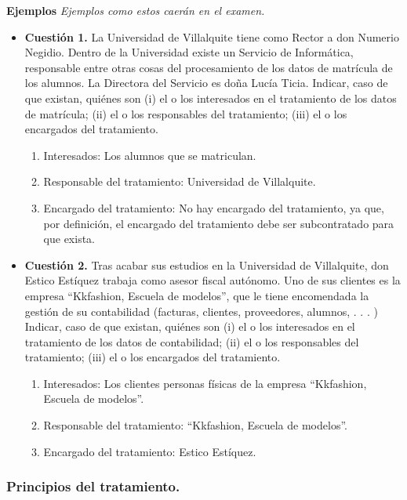 \documentclass[spanish, 12pt, a4paper, twoside]{article}
\begin{document}
\textbf{Ejemplos}
\textit{Ejemplos como estos caerán en el examen.}
\begin{itemize}
    \item \textbf{Cuestión 1.} La Universidad de Villalquite tiene como Rector a don Numerio Negidio. Dentro de la Universidad existe un Servicio de Informática, responsable entre otras cosas del procesamiento de los datos de matrícula de los alumnos. La Directora del Servicio es doña Lucía Ticia.
    Indicar, caso de que existan, quiénes son (i) el o los interesados en el tratamiento de los datos de matrícula; (ii) el o los responsables del tratamiento; (iii) el o los encargados del tratamiento.
    \begin{enumerate}
        \item Interesados: Los alumnos que se matriculan.
        \item Responsable del tratamiento: Universidad de Villalquite.
        \item Encargado del tratamiento: No hay encargado del tratamiento, ya que, por definición, el encargado del tratamiento debe ser subcontratado para que exista.
    \end{enumerate}

    \item \textbf{Cuestión 2.} Tras acabar sus estudios en la Universidad de Villalquite, don Estico Estíquez trabaja como asesor fiscal autónomo. Uno de sus clientes es la empresa “Kkfashion, Escuela de modelos”, que le tiene encomendada la gestión de su contabilidad (facturas, clientes, proveedores, alumnos, . . . )
    Indicar, caso de que existan, quiénes son (i) el o los interesados en el tratamiento de los datos de contabilidad; (ii) el o los responsables del tratamiento; (iii) el o los encargados del tratamiento.
    \begin{enumerate}
        \item Interesados: Los clientes personas físicas de la empresa “Kkfashion, Escuela de modelos”.
        \item Responsable del tratamiento: “Kkfashion, Escuela de modelos”.
        \item Encargado del tratamiento: Estico Estíquez.
    \end{enumerate}
\end{itemize}
    
\subsubsection{Principios del tratamiento.}
\end{document}
